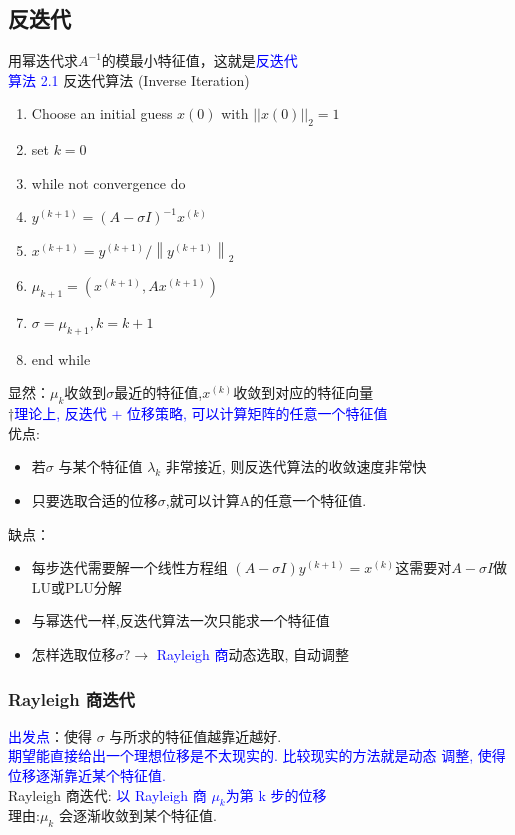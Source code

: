 \documentclass[12pt,a4paper]{article}
\begin{document}
\subsection{反迭代}
\noindent 用幂迭代求$A^{-1}$的模最小特征值，这就是\textcolor{blue}{反迭代}\\
\textcolor{blue}{算法 2.1} 反迭代算法 (Inverse Iteration)\\
\begin{enumerate}[1:]
	\item Choose an initial guess $x(0)$ with $||x(0)||_{2} = 1$
	\item set $k=0$
	\item while not convergence do
	\item \qquad$y^{(k+1)} = (A-\sigma I)^{-1}x^{(k)}$
	\item \qquad$x^{(k+1)}=y^{(k+1)} /\left\|y^{(k+1)}\right\|_{2}$
	\item \qquad$\mu_{k+1}=\left(x^{(k+1)}, A x^{(k+1)}\right)$
	\item \qquad$\sigma=\mu_{k+1},k=k+1$
	\item end while
\end{enumerate}
显然：$\mu_{k}$收敛到$\sigma$最近的特征值,$x^({k})$收敛到对应的特征向量\\
$\dagger$\textcolor{blue}{理论上, 反迭代 + 位移策略, 可以计算矩阵的任意一个特征值}\\
优点:
\begin{itemize}
	\item 若$\sigma$ 与某个特征值 $\lambda_{k}$ 非常接近, 则反迭代算法的收敛速度非常快
	\item 只要选取合适的位移$\sigma$,就可以计算A的任意一个特征值.
\end{itemize}
缺点：
\begin{itemize}
	\item 每步迭代需要解一个线性方程组 $(A-\sigma I) y^{(k+1)}=x^{(k)}$这需要对$A-\sigma I$做LU或PLU分解
	\item 与幂迭代一样,反迭代算法一次只能求一个特征值
	\item 怎样选取位移$\sigma ? \rightarrow$ \textcolor{blue}{Rayleigh 商}动态选取, 自动调整
\end{itemize}
\subsubsection{Rayleigh 商迭代}
\noindent \textcolor{blue}{出发点}：使得 $\sigma$ 与所求的特征值越靠近越好.\\

\textcolor{blue}{期望能直接给出一个理想位移是不太现实的. 比较现实的方法就是动态 调整, 使得位移逐渐靠近某个特征值.}\\
Rayleigh 商迭代: \textcolor{blue}{以 Rayleigh 商 $\mu_{k}$为第 k 步的位移}\\
理由:$\mu_{k}$ 会逐渐收敛到某个特征值.\\
\end{document}

